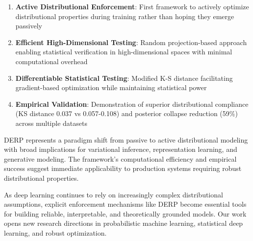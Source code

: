 \documentclass[11pt]{article}
\begin{document}
\begin{enumerate}
\item \textbf{Active Distributional Enforcement}: First framework to actively optimize distributional properties during training rather than hoping they emerge passively
\item \textbf{Efficient High-Dimensional Testing}: Random projection-based approach enabling statistical verification in high-dimensional spaces with minimal computational overhead  
\item \textbf{Differentiable Statistical Testing}: Modified K-S distance facilitating gradient-based optimization while maintaining statistical power
\item \textbf{Empirical Validation}: Demonstration of superior distributional compliance (KS distance 0.037 vs 0.057-0.108) and posterior collapse reduction (59\%) across multiple datasets
\end{enumerate}

DERP represents a paradigm shift from passive to active distributional modeling with broad implications for variational inference, representation learning, and generative modeling. The framework's computational efficiency and empirical success suggest immediate applicability to production systems requiring robust distributional properties.

As deep learning continues to rely on increasingly complex distributional assumptions, explicit enforcement mechanisms like DERP become essential tools for building reliable, interpretable, and theoretically grounded models. Our work opens new research directions in probabilistic machine learning, statistical deep learning, and robust optimization.



\end{document}
